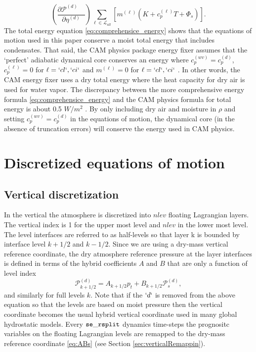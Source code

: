 \documentclass{agujournal}
\begin{document}
{\begin{equation}
\left( \frac{\partial \mathcal{P}^{(d)}\quad }{\partial \eta^{(d)}} \right)\sum_{\ell \in \mathcal{L}_{all}} \left[ m^{(\ell)}\left(K+c_p^{(\ell)}T+\Phi_s\right)\right].
\end{equation}
The total energy equation \eqref{eq:comprehensice_energy} shows that the equations of motion used in this paper conserve a moist total energy that includes condensates. That said, the CAM physics package energy fixer assumes that the `perfect' adiabatic dynamical core conserves an energy where $c_p^{(wv)}= c_p^{(d)}$, $c_p^{(\ell)}=0$ for $\ell=`cl`,`ci`$ and $m^{(\ell)}=0$ for $\ell=`cl`,`ci`$ \citep{WOHTTV2015JAMES}. In other words, the CAM energy fixer uses a dry total energy where the heat capacity for dry air is used for water vapor. The discrepancy between the more comprehensive energy formula \eqref{eq:comprehensice_energy} and the CAM physics formula for total energy is about 0.5 $W/m^2$ \citep{T2011LNCSEb}. By only including dry air and moisture in $\rho$ and setting $c_p^{(wv)}= c_p^{(d)}$ in the equations of motion, the dynamical core (in the absence of truncation errors) will conserve the energy used in CAM physics.

\section{Discretized equations of motion}\label{sec:discretized_eqs}
\subsection{Vertical discretization}
In the vertical the atmosphere is discretized into $nlev$ floating Lagrangian layers. The vertical index is 1 for the upper most level and $nlev$ in the lower most level. The level interfaces are referred to as half-levels so that layer k is bounded by interface level $k+1/2$ and $k-1/2$. Since we are using a dry-mass vertical reference coordinate, the dry atmosphere reference pressure at the layer interfaces is defined in terms of the hybrid coefficients $A$ and $B$
 that are only a function of level index
\begin{equation}
\mathcal{P}^{(d)}_{k+1/2}=A_{k+1/2}p_t+B_{k+1/2}\mathcal{P}_s^{(d)},\label{eq:ABs}
\end{equation}
and similarly for full levels $k$. Note that if the $`d`$ is removed from the above equation so that the levels are based on moist pressure then the vertical coordinate becomes the usual hybrid vertical coordinate used in many global hydrostatic models. Every ${\tt{se\_rsplit}}$ dynamics time-steps the prognositc variables on the floating Lagrangian levels are remapped to the dry-mass reference coordinate \eqref{eq:ABs} (see Section \ref{sec:verticalRemappin}). 

}
\end{document}
